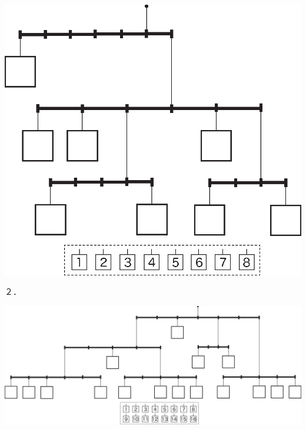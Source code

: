 \documentclass[./main]{subfiles}
\begin{document}
\begin{center}
\includegraphics[scale=0.6]{morikawa_image/morikawa_puzzle_1.eps}
\end{center}
２．
\begin{center}
\includegraphics[scale=0.6]{morikawa_image/morikawa_puzzle_2.eps}
\end{center}
\end{document}
